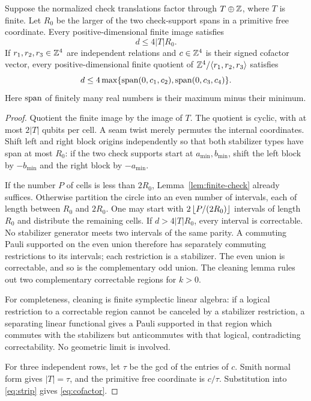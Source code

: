 \begin{lemma}\label{lem:strip}
Suppose the normalized check translations factor through $T\oplus\mathbb Z$, where $T$ is finite. Let $R_0$ be the larger of the two check-support spans in a primitive free coordinate. Every positive-dimensional finite image satisfies
\begin{equation}\label{eq:strip}
 d\le4|T|R_0.
\end{equation}
If $r_1,r_2,r_3\in\mathbb Z^4$ are independent relations and $c\in\mathbb Z^4$ is their signed cofactor vector, every positive-dimensional finite quotient of $\mathbb Z^4/\langle r_1,r_2,r_3\rangle$ satisfies
\begin{equation}\label{eq:cofactor}
 d\le4\max\{\operatorname{span}(0,c_1,c_2),\operatorname{span}(0,c_3,c_4)\}.
\end{equation}
Here $\operatorname{span}$ of finitely many real numbers is their maximum minus their minimum.
\end{lemma}
\begin{proof}
Quotient the finite image by the image of $T$. The quotient is cyclic, with at most $2|T|$ qubits per cell. A seam twist merely permutes the internal coordinates. Shift left and right block origins independently so that both stabilizer types have span at most $R_0$: if the two check supports start at $a_{\min},b_{\min}$, shift the left block by $-b_{\min}$ and the right block by $-a_{\min}$.

If the number $P$ of cells is less than $2R_0$, Lemma~\ref{lem:finite-check} already suffices. Otherwise partition the circle into an even number of intervals, each of length between $R_0$ and $2R_0$. One may start with $2\left\lfloor P/(2R_0)\right\rfloor$ intervals of length $R_0$ and distribute the remaining cells. If $d>4|T|R_0$, every interval is correctable. No stabilizer generator meets two intervals of the same parity. A commuting Pauli supported on the even union therefore has separately commuting restrictions to its intervals; each restriction is a stabilizer. The even union is correctable, and so is the complementary odd union. The cleaning lemma rules out two complementary correctable regions for $k>0$.

For completeness, cleaning is finite symplectic linear algebra: if a logical restriction to a correctable region cannot be canceled by a stabilizer restriction, a separating linear functional gives a Pauli supported in that region which commutes with the stabilizers but anticommutes with that logical, contradicting correctability. No geometric limit is involved.

For three independent rows, let $\tau$ be the gcd of the entries of $c$. Smith normal form gives $|T|=\tau$, and the primitive free coordinate is $c/\tau$. Substitution into \eqref{eq:strip} gives \eqref{eq:cofactor}.
\end{proof}

